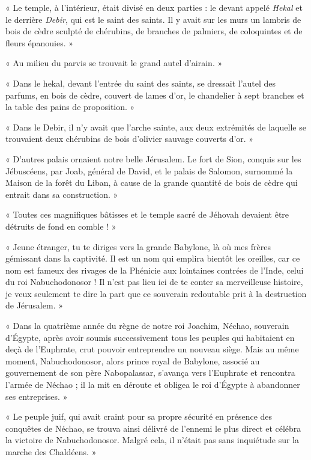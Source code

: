 \documentclass[a4paper, 11pt, oneside, polutonikogreek, french]{article}
\begin{document}
« Le temple, à l'intérieur, était divisé en deux parties : le devant appelé \emph{Hekal} et le derrière \emph{Debir}, qui est le saint des saints. Il y avait sur les murs un lambris de bois de cèdre sculpté de chérubins, de branches de palmiers, de coloquintes et de fleurs épanouies. »

« Au milieu du parvis se trouvait le grand autel d'airain. »

« Dans le hekal, devant l'entrée du saint des saints, se dressait l'autel des parfums, en bois de cèdre, couvert de lames d'or, le chandelier à sept branches et la table des pains de proposition. »

« Dans le Debir, il n'y avait que l'arche sainte, aux deux extrémités de laquelle se trouvaient deux chérubins de bois d'olivier sauvage couverts d'or. »

« D'autres palais ornaient notre belle Jérusalem. Le fort de Sion, conquis sur les Jébuscéens, par Joab, général de David, et le palais de Salomon, surnommé la Maison de la forêt du Liban, à cause de la grande quantité de bois de cèdre qui entrait dans sa construction. »

« Toutes ces magnifiques bâtisses et le temple sacré de Jéhovah devaient être détruits de fond en comble ! »

\bigskip
\centerline{\EightStarTaper}
\centerline{\EightStarTaper\EightStarTaper}
\bigskip

« Jeune étranger, tu te diriges vers la grande Babylone, là où mes frères gémissant dans la captivité. Il est un nom qui emplira bientôt les oreilles, car ce nom est fameux des rivages de la Phénicie aux lointaines contrées de l'Inde, celui du roi Nabuchodonosor ! Il n'est pas lieu ici de te conter sa merveilleuse histoire, je veux seulement te dire la part que ce souverain redoutable prit à la destruction de Jérusalem. »

\bigskip
\centerline{\EightStarTaper}
\centerline{\EightStarTaper\EightStarTaper}
\bigskip

« Dans la quatrième année du règne de notre roi Joachim, Néchao, souverain d'Égypte, après avoir soumis successivement tous les peuples qui habitaient en deçà de l'Euphrate, crut pouvoir entreprendre un nouveau siège. Mais au même moment, Nabuchodonosor, alors prince royal de Babylone, associé au gouvernement de son père Nabopalassar, s'avança vers l'Euphrate et rencontra l'armée de Néchao ; il la mit en déroute et obligea le roi d'Égypte à abandonner ses entreprises. »

« Le peuple juif, qui avait craint pour sa propre sécurité en présence des conquêtes de Néchao, se trouva ainsi délivré de l'ennemi le plus direct et célébra la victoire de Nabuchodonosor. Malgré cela, il n'était pas sans inquiétude sur la marche des Chaldéens. »
\end{document}
